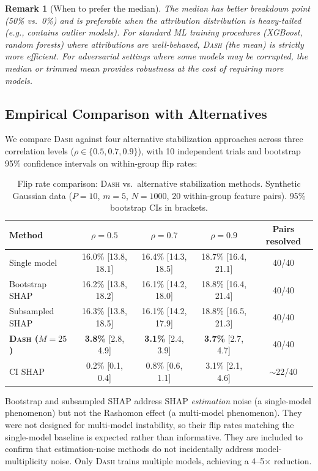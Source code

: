 \documentclass{article}
\newtheorem{remark}[theorem]{Remark}
\newcommand{\DASH}{\textsc{Dash}}
\begin{document}
\begin{remark}[When to prefer the median]
The median has better breakdown point (50\% vs.\ 0\%) and is
preferable when the attribution distribution is heavy-tailed
(e.g., contains outlier models). For standard ML training procedures
(XGBoost, random forests) where attributions are well-behaved,
\DASH{} (the mean) is strictly more efficient. For adversarial
settings where some models may be corrupted, the median or trimmed
mean provides robustness at the cost of requiring more models.
\end{remark}

\subsection{Empirical Comparison with Alternatives}
\label{sec:dash-benchmark}

We compare \DASH{} against four alternative stabilization approaches across three correlation levels ($\rho \in \{0.5, 0.7, 0.9\}$), with 10 independent trials and bootstrap 95\% confidence intervals on within-group flip rates:

\begin{table}[t]
\centering
\caption{Flip rate comparison: \DASH{} vs.\ alternative stabilization methods. Synthetic Gaussian data ($P{=}10$, $m{=}5$, $N{=}1000$, 20 within-group feature pairs). 95\% bootstrap CIs in brackets.}
\label{tab:dash-benchmark}
\small
\begin{tabular}{@{}lcccc@{}}
\toprule
Method & $\rho = 0.5$ & $\rho = 0.7$ & $\rho = 0.9$ & Pairs resolved \\
\midrule
Single model       & 16.0\% [13.8, 18.1] & 16.4\% [14.3, 18.5] & 18.7\% [16.4, 21.1] & 40/40 \\
Bootstrap SHAP     & 16.2\% [13.8, 18.2] & 16.1\% [14.2, 18.0] & 18.8\% [16.4, 21.4] & 40/40 \\
Subsampled SHAP    & 16.3\% [13.8, 18.5] & 16.1\% [14.2, 17.9] & 18.8\% [16.5, 21.3]  & 40/40 \\
\textbf{\DASH{} ($M{=}25$)} & \textbf{3.8\%} [2.8, 4.9] & \textbf{3.1\%} [2.4, 3.9] & \textbf{3.7\%} [2.7, 4.7] & 40/40 \\
CI SHAP            & 0.2\% [0.1, 0.4]    & 0.8\% [0.6, 1.1]    & 3.1\% [2.1, 4.6]     & $\sim$22/40 \\
\bottomrule
\end{tabular}
\end{table}

Bootstrap and subsampled SHAP address SHAP \emph{estimation} noise (a single-model phenomenon) but not the Rashomon effect (a multi-model phenomenon). They were not designed for multi-model instability, so their flip rates matching the single-model baseline is expected rather than informative. They are included to confirm that estimation-noise methods do not incidentally address model-multiplicity noise. Only \DASH{} trains multiple models, achieving a 4--5$\times$ reduction.
\end{document}
